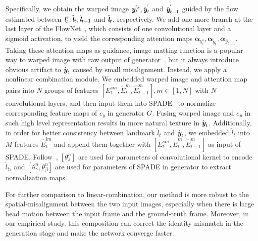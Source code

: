 \documentclass[runningheads]{llncs}
\def\mathbi#1{\textbf{\em #1}}
\begin{document}
 Specifically, we obtain the warped image $\mathbi{y}_t^{'s}, \tilde{\mathbi{y}}_t^{'} $ and $\hat{\mathbi{y}}_{t-1}^{'}$ guided by the flow estimated between ${\mathbi{l}}^s_t, {\tilde{\mathbi{l}}}_t, {\hat{\mathbi{l}}}_{t-1} $ and ${\hat{\mathbi{l}}}_t$, respectively. We add one more branch at the last layer of the FlowNet~\cite{wang2018vid2vid}, which consists of one convolutional layer and a sigmoid activation, to yield the corresponding attention maps $\boldsymbol{\alpha}_{y_t^s}, \boldsymbol{\alpha}_{\tilde{y}_t}, \boldsymbol{\alpha}_{\hat{y}_{t-1}} $. Taking these attention maps as guidance, image matting function is a popular way to warped image with raw output of generator~\cite{wang2018fewshotvid2vid,wang2018vid2vid,chen2019hierarchical,pumarola2019ganimation}, but it always introduce obvious artifact to $\hat{\mathbi{y}}_{t}$ caused by small misalignment. Instead, we apply a nonlinear combination module. We embedded warped image and attention map pairs into $N$ groups of features $[E_t^{sm},\tilde{E}_t^m, \hat{E}_{t-1}^m], m\in [1, N]$ with $N$ convolutional layers, and then input them into SPADE~\cite{park2019semantic} to normalize corresponding feature maps of $e_y$ in generator $G$. Fusing warped image and $e_y$ in such high level representation results in more natural texture in $\hat{\mathbi{y}}_{t}$. Additionally, in order for better consistency between landmark $\hat{l}_t$ and $\hat{\mathbi{y}}_{t}$, we embedded $\hat{l}_t$ into $M$ features $\hat{E}_t^{lm}$ and append them together with $[E_t^{sm},\tilde{E}_t^m, \hat{E}_{t-1}^m]$ as input of SPADE. Follow~\cite{wang2018fewshotvid2vid}, $[\theta_s^n]$ are used for parameters of convolutional kernel to encode $\hat{l}_t$, and $[\theta_\gamma^n, \theta_\beta^n]$ are used for parameters of SPADE in generator to extract normalization maps.

 For further comparison to linear-combination, our method is more robust to the spatial-misalignment between the two input images, especially when there is large head motion between the input frame and the ground-truth frame. Moreover, in our empirical study, this composition can correct the identity mismatch in the generation stage and make the network converge faster.
\end{document}
